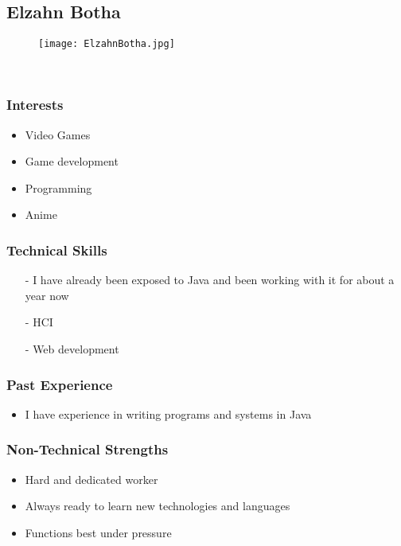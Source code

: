 
\subsection{Elzahn Botha}
\begin{wrapfigure}[6]{l}{0.25\textwidth}
\vspace{10pt}
\texttt{[image: ElzahnBotha.jpg]}
\end{wrapfigure}

\textcolor{white}{.}
\subsubsection{Interests}
\begin{itemize}
	\item{Video Games}
	\item{Game development}
	\item{Programming}
	\item{Anime}
\end{itemize}
\subsubsection{Technical Skills} 
\begin{itemize}
	\item[-]{I have already been exposed to Java and been working with it for about a year now}
	\item[-]{HCI}
	\item[-]{Web development}
\end{itemize}
\subsubsection{Past Experience}
\begin{itemize}
	\item{I have experience in writing programs and systems in Java}
\end{itemize}
\subsubsection{Non-Technical Strengths} 
\begin{itemize}
	\item{Hard and dedicated worker}
	\item{Always ready to learn new technologies and languages}
	\item{Functions best under pressure}
\end{itemize}
